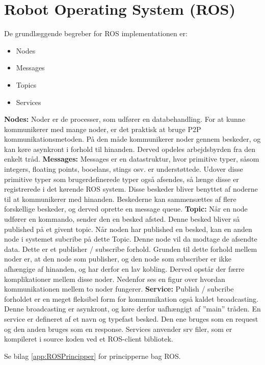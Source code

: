\chapter{Robot Operating System (ROS)}\label{chap:ROS}
De grundlæggende begreber for ROS implementationen er:
\begin{itemize}  
\item Nodes
\item Messages
\item Topics
\item Services
\end{itemize}
\textbf{Nodes:} Noder er de processer, som udfører en databehandling. For at kunne kommunikerer med mange noder, er det praktisk at bruge P2P kommunikationsmetoden. På den måde kommunikerer noder gennem beskeder, og kan køre asynkront i forhold til hinanden. Derved opdeles arbejdsbyrden fra den enkelt tråd.\newline
\newline
\textbf{Messages:} Messages er en datastruktur, hvor primitive typer,  såsom integers, floating points, booelans, stings osv. er understøttede. Udover disse primitive typer som brugerdefinerede typer også afsendes, så længe disse er registrerede i det kørende ROS system. Disse beskeder bliver benyttet af noderne til at kommunikerer med hinanden. Beskederne kan sammensættes af flere forskellige beskeder, og derved oprette en message queue.\newline
\newline
\textbf{Topic:} Når en node udfører en kommando, sender den en besked afsted. Denne besked bliver så published på et givent topic. Når noden har published en besked, kan en anden node i systemet subcribe på dette Topic. Denne node vil da modtage de afsendte data. Dette er et publisher / subscribe forhold. Grunden til dette forhold mellem noder er, at den node som publisher, og den node som subscriber er ikke afhængige af hinanden, og har derfor en lav kobling. Derved opstår der færre komplikationer mellem disse noder.\newline
Nedenfor ses en figur over hvordan kommunikationen mellem to noder fungerer.
\textbf{Service:} Publish / subcribe forholdet er en meget fleksibel form for kommunikation også kaldet broadcasting. Denne broadcasting er asynkront, og køre derfor uafhængigt af ''main'' tråden. En service er defineret af et navn og typefast besked. Den ene bruges som en request og den anden bruges som en response. Services anvender srv filer, som er kompileret i source koden ved et ROS-client bibliotek.

Se bilag \vref{app:ROSPrincipper} for principperne bag ROS.